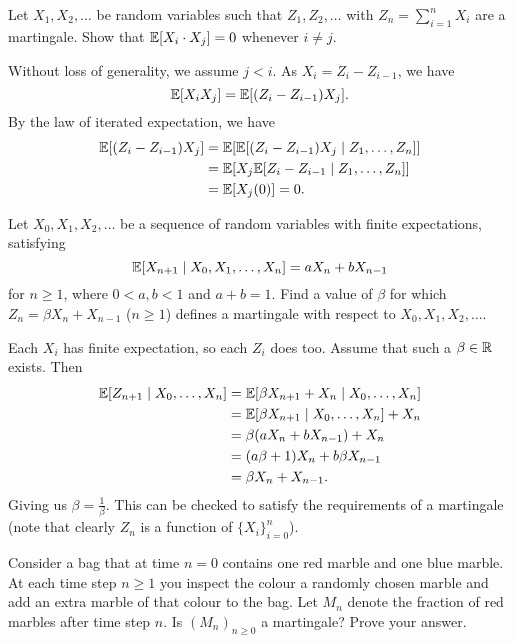 \question Let $X_1, X_2, \ldots$ be random variables such that $Z_1, Z_2, \ldots$ with $Z_n = \sum_{i=1}^n X_i$ are a martingale. Show that $\mathbb E[X_i \cdot X_j] = 0$ whenever $i \neq j$.

\begin{solution}
    Without loss of generality, we assume $j < i$. As $X_i = Z_i - Z_{i-1}$, we have
    \[ \mathbb E[X_iX_j] = \mathbb E[(Z_i - Z_{i-1})X_j]. \]
    By the law of iterated expectation, we have
    \begin{align*}
        \mathbb E[(Z_i - Z_{i-1})X_j] & = \mathbb E[\mathbb E[(Z_i - Z_{i-1})X_j \mid Z_1, \ldots, Z_n]] \\
                               & = \mathbb E[X_j\mathbb E[Z_i - Z_{i-1} \mid Z_1, \ldots, Z_n]]   \\
                               & = \mathbb E[X_j(0)] = 0.
    \end{align*}
\end{solution}

\question Let $X_0, X_1, X_2, \ldots$ be a sequence of random variables with finite expectations, satisfying
\[ \mathbb E[X_{n+1} \mid X_0, X_1, \ldots, X_n] = aX_n + bX_{n-1} \]
for $n \geq 1$, where $0 < a,b < 1$ and $a + b = 1$. Find a value of $\beta$ for which $Z_n = \beta X_n + X_{n-1}$ ($n \geq 1$) defines a martingale with respect to $X_0, X_1, X_2, \ldots$.

\begin{solution}
    Each $X_i$ has finite expectation, so each $Z_i$ does too. Assume that such a $\beta \in \mathbb R$ exists. Then
    \begin{align*}
        \mathbb E[Z_{n+1} \mid X_0, \ldots, X_n] & = \mathbb E[\beta X_{n+1} + X_{n} \mid X_0, \ldots, X_n] \\
                                          & = \mathbb E[\beta X_{n+1} \mid X_0, \ldots, X_n] + X_n   \\
                                          & = \beta(aX_n + bX_{n-1}) + X_n                    \\
                                          & = (a\beta+1)X_n + b\beta X_{n-1}                  \\
                                          & = \beta X_n + X_{n-1}.
    \end{align*}
    Giving us $\beta = \frac{1}{\beta}$. This can be checked to satisfy the requirements of a martingale (note that clearly $Z_n$ is a function of $\{X_i\}_{i=0}^n$).
\end{solution}

\question Consider a bag that at time $n = 0$ contains one red marble and one blue marble. At each time step $n \geq 1$ you inspect the colour a randomly chosen marble and add an extra marble of that colour to the bag. Let $M_n$ denote the fraction of red marbles after time step $n$. Is $(M_n)_{n \geq 0}$ a martingale? Prove your answer.

